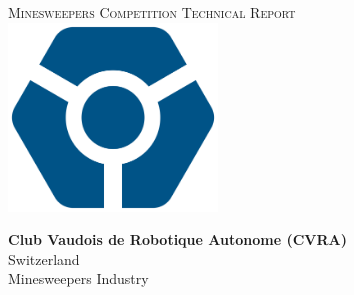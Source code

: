 \begin{titlepage}
\begin{center}

\Huge{\textsc{Minesweepers Competition Technical Report}}
\vspace{1cm}~\\
\includegraphics[height=5cm]{emblem}
\vspace{1cm}

\large{\textbf{Club Vaudois de Robotique Autonome (CVRA)}}\\
Switzerland\\
Minesweepers Industry

\vspace{2cm}

\begin{abstract}
    
\end{abstract}

\end{center}
\end{titlepage}
